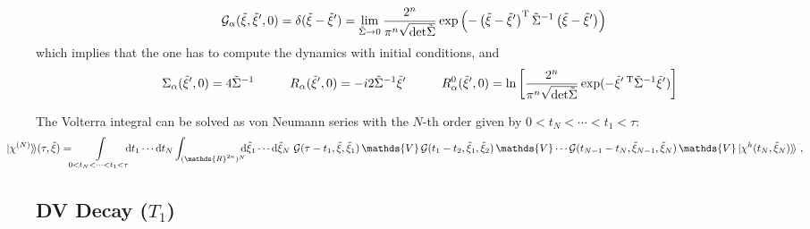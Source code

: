 \documentclass[%
reprint,
superscriptaddress,
nofootinbib,
 amsmath,amssymb,
prx,
floatfix,
]{revtex4-2}
\newcommand{\dket}[1]{\lvert #1 \rangle\!\rangle}
\begin{document}
\begin{align}
    \mathcal{G}_{\alpha}(\tilde{\xi}, \tilde{\xi}', 0) &= \delta(\tilde{\xi}-\tilde{\xi}') = \lim_{\tilde{\Sigma} \to 0}  \frac{2^n}{\pi^n \sqrt{\text{det} \tilde{\Sigma} }} \exp \left( - \left(\tilde{\xi}- \tilde{\xi}'\right)^{\rm T} \tilde{\Sigma}^{-1} \left(\tilde{\xi}- \tilde{\xi}'\right) \right) 
\end{align}
which implies that the one has to compute the dynamics with initial conditions, and 
\begin{equation}
    \Sigma_\alpha (\tilde{\xi}',0) = 4 \tilde{\Sigma}^{-1} \hspace{1cm} R_\alpha (\tilde{\xi}',0) = - i 2  \tilde{\Sigma}^{-1} \tilde{\xi}' \hspace{1cm} R^{0}_{\alpha}(\tilde{\xi}',0)  =  \ln \left[ \frac{2^n}{\pi^n \sqrt{\text{det} \tilde{\Sigma} }} \exp(- \tilde{\xi}'^{ \; \rm T } \tilde{\Sigma}^{-1} \tilde{\xi}') \right]
\end{equation}

The Volterra integral can be solved as von Neumann series with  the $N$-th order given by $0<t_N<\cdots<t_1<\tau$:
\begin{equation}
    \hspace{-1cm}
    \dket{\chi^{(N)}}(\tau,\tilde{\xi}) = \!\!\int\limits_{0<t_N<\cdots<t_1<\tau} \!\!\!\! {\rm d}t_1\cdots{\rm d}t_N \int_{(\mathds{R}^{2n})^N} \!\!\!\! {\rm d}\tilde{\xi}_1\cdots{\rm d}\tilde{\xi}_N\ \mathcal{G}(\tau-t_1,\tilde{\xi},\tilde{\xi}_1)\,\mathds{V}\, \mathcal{G}(t_1-t_2,\tilde{\xi}_1,\tilde{\xi}_2)\,\mathds{V}\cdots \mathcal{G}(t_{N-1}-t_N,\tilde{\xi}_{N-1},\tilde{\xi}_N)\,\mathds{V}\,\dket{\chi^{h}(t_N,\tilde{\xi}_N)}\ ,
\end{equation}

\subsection{DV Decay ($T_1$) \label{app:qubit_decay}}
\end{document}
